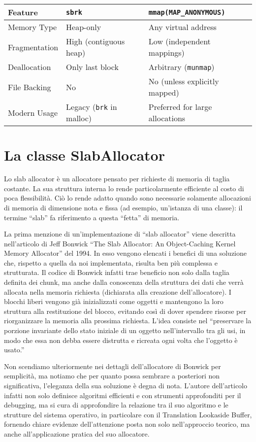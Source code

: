 \begin{table}[h]
\centering
\begin{tabular}{|l|l|l|}
\hline
Feature & \texttt{sbrk} & \texttt{mmap(MAP\_ANONYMOUS)} \\
\hline
Memory Type & Heap-only & Any virtual address \\
Fragmentation & High (contiguous heap) & Low (independent mappings) \\
Deallocation & Only last block & Arbitrary (\texttt{munmap}) \\
File Backing & No & No (unless explicitly mapped) \\
Modern Usage & Legacy (\texttt{brk} in malloc) & Preferred for large allocations \\
\hline
\end{tabular}
\end{table}

\section{La classe SlabAllocator}

Lo slab allocator è un allocatore pensato per richieste di memoria di taglia costante. La sua struttura interna lo rende particolarmente efficiente al costo di poca flessibilità. Ciò lo rende adatto quando sono necessarie solamente allocazioni di memoria di dimensione nota e fissa (ad esempio, un’istanza di una classe): il termine “slab” fa riferimento a questa “fetta” di memoria.

La prima menzione di un’implementazione di “slab allocator” viene descritta nell’articolo di Jeff Bonwick ``The Slab Allocator: An Object-Caching Kernel Memory Allocator'' del 1994. In esso vengono elencati i benefici di una soluzione che, rispetto a quella da noi implementata, risulta ben più complessa e strutturata. Il codice di Bonwick infatti trae beneficio non solo dalla taglia definita dei chunk, ma anche dalla conoscenza della struttura dei dati che verrà allocata nella memoria richiesta (dichiarata alla creazione dell’allocatore). I blocchi liberi vengono già inizializzati come oggetti e mantengono la loro struttura alla restituzione del blocco, evitando così di dover spendere risorse per riorganizzare la memoria alla prossima richiesta. L’idea consiste nel ``preservare la porzione invariante dello stato iniziale di un oggetto nell’intervallo tra gli usi, in modo che essa non debba essere distrutta e ricreata ogni volta che l’oggetto è usato.''

Non scendiamo ulteriormente nei dettagli dell’allocatore di Bonwick per semplicità, ma notiamo che per quanto possa sembrare a posteriori non significativa, l’eleganza della sua soluzione è degna di nota. L’autore dell’articolo infatti non solo definisce algoritmi efficienti e con strumenti approfonditi per il debugging, ma si cura di approfondire la relazione tra il suo algoritmo e le strutture del sistema operativo, in particolare con il Translation Lookaside Buffer, fornendo chiare evidenze dell’attenzione posta non solo nell’approccio teorico, ma anche all’applicazione pratica del suo allocatore.

